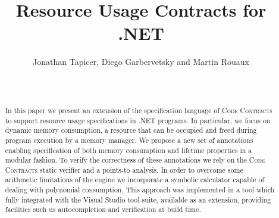 \documentclass[letterpaper]{sig-alternate}
\begin{document}
 

%

\title{Resource Usage Contracts for .NET}


\author{
\alignauthor
Jonathan Tapicer, Diego Garbervetsky and Martin Rouaux\\
 \\
\\
}

\maketitle

\begin{abstract}
In this paper we present an extension of the specification language of \textsc{Code Contracts} to support resource usage specifications in .NET programs. In particular, we focus on dynamic memory consumption, a resource that can be occupied and freed during program execution by a memory manager.
We propose a new set of  annotations enabling specification of both memory consumption and lifetime properties in a modular fashion.
To verify the correctness of these annotations we rely on the \textsc{Code Contracts} static verifier and a points-to analysis. 
In order to overcome some arithmetic limitations of the engine we incorporate a symbolic calculator capable of dealing with polynomial consumption.
This approach was implemented in a tool which fully integrated with the Visual Studio tool-suite, available as an extension, providing facilities such us autocompletion and verification at build time.
\end{abstract}
\end{document}

